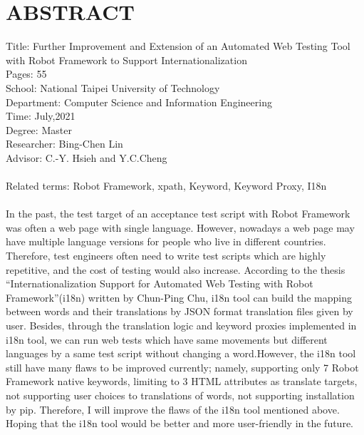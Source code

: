 \chapter*{ABSTRACT}


\noindent
Title: Further Improvement and Extension of an Automated Web Testing Tool 
with Robot Framework to Support Internationalization\\
Pages: 55\\
School: National Taipei University of Technology\\
Department: Computer Science and Information Engineering\\
Time: July,2021\\
Degree: Master\\
Researcher: Bing-Chen Lin\\
Advisor: C.-Y. Hsieh and Y.C.Cheng\\
\hspace*{\fill}\\
Related terms: Robot Framework, xpath, Keyword, Keyword Proxy, I18n\\
\hspace*{\fill}\\
%
\indent
In the past, the test target of an acceptance test script with Robot Framework was often a  web page with single language. However, nowadays a web page may have multiple language versions for people who live in different countries. Therefore, test engineers often need to write test scripts which are highly repetitive, and the cost of testing would also increase. According to the thesis “Internationalization Support for Automated Web Testing with Robot Framework”(i18n) written by Chun-Ping Chu, i18n tool can build the mapping between words and their translations by JSON format translation files given by user. Besides, through the translation logic and keyword proxies implemented in i18n tool, we can run web tests which have same movements but different languages by a same test script without changing a word.However, the i18n tool still have many flaws to be improved currently; namely, supporting only 7 Robot Framework native keywords, limiting to 3 HTML attributes as translate targets, not supporting user choices to translations of words, not supporting installation by pip. Therefore, I will improve the flaws of the i18n tool mentioned above. Hoping that the i18n tool would be better and more user-friendly in the future.
